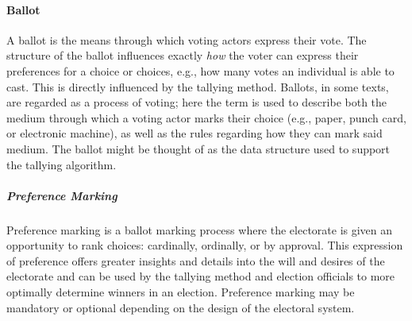 %

\paragraph{Ballot}
A ballot is the means through which voting actors express their vote. The
structure of the ballot influences exactly \emph{how} the voter can express
their preferences for a choice or choices, e.g., how many votes an individual is
able to cast. This is directly influenced by the tallying method. Ballots, in
some texts, are regarded as a process of voting; here the term is used to
describe both the medium through which a voting actor marks their choice (e.g.,
paper, punch card, or electronic machine), as well as the rules regarding how
they can mark said medium. The ballot might be thought of as the data structure
used to support the tallying algorithm.

\subparagraph{Preference Marking}
Preference marking is a ballot marking process where the electorate is given an
opportunity to rank choices: cardinally, ordinally, or by approval. This
expression of preference offers greater insights and details into the will and
desires of the electorate and can be used by the tallying method and election
officials to more optimally determine winners in an election. Preference marking
may be mandatory or optional depending on the design of the electoral system.

